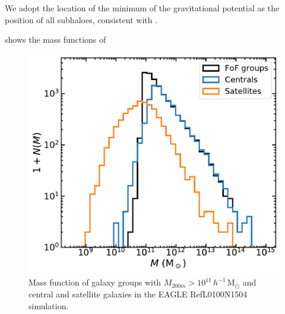 \documentclass[usenatbib,fleqn]{mnras}
\newcommand{\Msun}{\mathrm{M}_\odot}
\newcommand{\hMsun}{h^{-1}\,\Msun}
\begin{document}
We adopt the location of the minimum of the gravitational potential as the position of all subhaloes, consistent with \cite{velliscig17}.

 shows the mass functions of 

\begin{figure}
  \centerline{\includegraphics[width=\linewidth]{massfunction.pdf}}
\caption{Mass function of galaxy groups with $M_{200m}>10^{11}\,\hMsun$ and central and satellite galaxies in the EAGLE RefL0100N1504 simulation.}
\label{f:massfunction}
\end{figure}
\end{document}

